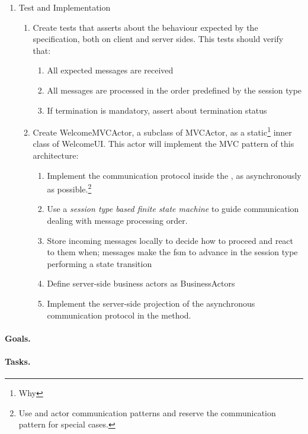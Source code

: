 \begin{enumerate}
\item Test and Implementation
  \begin{enumerate}
  \item Create tests that asserts about the behaviour expected by the
    specification, both on client and server sides. This tests should
    verify that:
    \begin{enumerate}
    \item All expected messages are received
    \item All messages are processed in the order predefined by the
      session type
    \item If termination is mandatory, assert about termination status
    \end{enumerate}
  \item Create WelcomeMVCActor, a subclass of MVCActor, as a
    static\footnote{Why } inner class of WelcomeUI. This
    actor will implement the MVC pattern of this architecture:
    \begin{enumerate}
    \item Implement the communication protocol inside the
      , as asynchronously as possible.\footnote{Use
         and  actor communication patterns
        and reserve the  communication pattern for special
        cases.}
    \item Use a \emph{session type based finite state machine} to
      guide communication dealing with message processing order.
    \item Store incoming messages locally to decide how to proceed and
      react to them when; messages make the fsm to advance in the
      session type performing a state transition
    \item Define server-side business actors as BusinessActors
    \item Implement the server-side projection of the asynchronous
      communication protocol in the  method.
    \end{enumerate}
  \end{enumerate}
\end{enumerate}

\paragraph{Goals.}


\paragraph{Tasks.}






